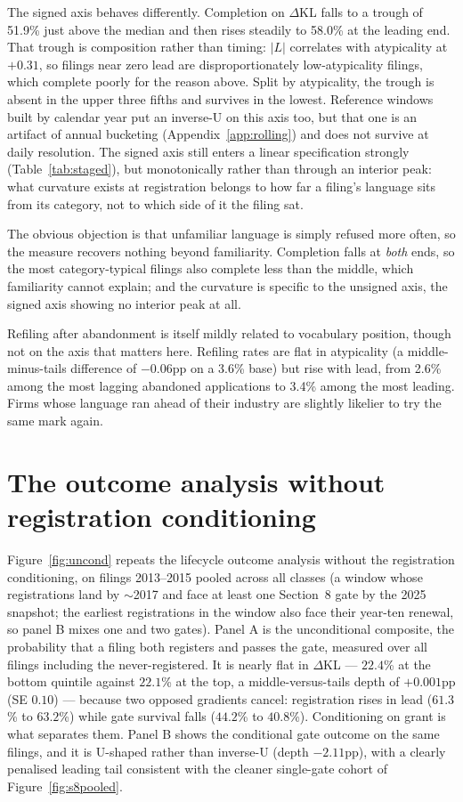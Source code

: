 \documentclass[11pt]{article}
\newcommand{\dkl}{$\Delta$KL}
\begin{document}
The signed axis behaves differently. Completion on \dkl{} falls to a trough of
51.9\% just above the median and then rises steadily to 58.0\% at the leading
end. That trough is composition rather than timing: $|L|$ correlates with
atypicality at $+0.31$, so filings near zero lead are disproportionately
low-atypicality filings, which complete poorly for the reason above. Split by
atypicality, the trough is absent in the upper three fifths and survives in
the lowest. Reference windows built by calendar year put an inverse-U on this
axis too, but that one is an artifact of annual bucketing
(Appendix~\ref{app:rolling}) and does not survive at daily resolution. The
signed axis still enters a linear specification strongly
(Table~\ref{tab:staged}), but monotonically rather than through an interior
peak: what curvature exists at registration belongs to how far a filing's
language sits from its category, not to which side of it the filing sat.

The obvious objection is that unfamiliar language is simply refused more
often, so the measure recovers nothing beyond familiarity. Completion falls at
\emph{both} ends, so the most category-typical filings also complete less than
the middle, which familiarity cannot explain; and the curvature is specific to
the unsigned axis, the signed axis showing no interior peak at all.

Refiling after abandonment is itself mildly related to vocabulary position,
though not on the axis that matters here. Refiling rates are flat in
atypicality (a middle-minus-tails difference of $-0.06$pp on a 3.6\% base) but
rise with lead, from 2.6\% among the most lagging abandoned applications to
3.4\% among the most leading. Firms whose language ran ahead of their industry
are slightly likelier to try the same mark again.

\section{The outcome analysis without registration conditioning}\label{app:uncond}

Figure~\ref{fig:uncond} repeats the lifecycle outcome analysis without the
registration conditioning, on filings 2013--2015 pooled across all classes
(a window whose registrations land by $\sim$2017 and face at least one
Section~8 gate by the 2025 snapshot; the earliest registrations in the
window also face their year-ten renewal, so panel B mixes one and two
gates). Panel A is the unconditional composite, the probability that a
filing both registers and passes the gate, measured over all filings
including the never-registered. It is nearly flat in \dkl{} --- $22.4$\% at the bottom quintile against
$22.1$\% at the top, a middle-versus-tails depth of $+0.001$pp (SE $0.10$) ---
because two opposed gradients cancel: registration rises in lead
($61.3$\% to $63.2$\%) while gate survival falls ($44.2$\% to $40.8$\%).
Conditioning on grant is what separates them. Panel B shows the conditional
gate outcome on the same filings, and it is U-shaped rather than inverse-U
(depth $-2.11$pp), with a clearly penalised leading tail consistent with the
cleaner single-gate cohort of Figure~\ref{fig:s8pooled}.
\end{document}
